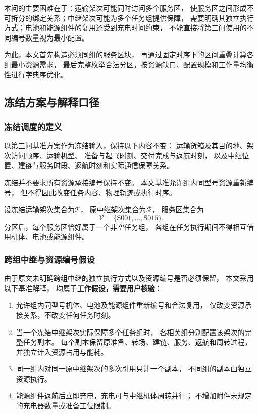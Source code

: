 \documentclass[bwprint]{gmcmthesis}
\begin{document}
本问的主要困难在于：运输架次可能同时访问多个服务区，
使服务区之间形成不可拆分的绑定关系；中继架次可能为多个任务组提供保障，
需要明确其独立执行方式；电池和能源组件的复用还受到充电时间约束，
不能直接将第三问使用的不同编号数量视为最小配置。

为此，本文首先构造必须同组的服务区块，
再通过固定时序下的区间重叠计算各组最小资源需求，
最后完整枚举合法分区，按资源缺口、配置规模和工作量均衡性进行字典序优化。

\subsection{冻结方案与解释口径}

\subsubsection{冻结调度的定义}

以第三问基准方案作为冻结输入，保持以下内容不变：
运输货箱及其目的地、架次访问顺序、运输机型、
准备与起飞时刻、交付完成与返航时刻，
以及中继位置、建链与服务时段、返航时刻和实际通信保障关系。

冻结并不要求所有资源承接编号保持不变。
本文基准允许组内同型号资源重新编号，
但不得因此改变任务内容、物理轨迹或执行时序。

设冻结运输架次集合为$\mathcal{T}$，
原中继架次集合为$\mathcal{R}$，
服务区集合为
\begin{equation}
\mathcal{V}=\{\mathrm{S001},\ldots,\mathrm{S015}\}.
\end{equation}
分区后，每个服务区恰好属于一个非空任务组，
各组在任务执行期间不得相互借用机体、电池或能源组件。

\subsubsection{跨组中继与资源编号假设}

由于原文未明确跨组中继的独立执行方式以及资源编号是否必须保留，
本文采用以下基准解释，
均属于\textbf{工作假设，需要用户核验}：

\begin{enumerate}
    \item 允许组内同型号机体、电池及能源组件重新编号和合法复用，
    仅改变资源承接关系，不改变任何任务时刻。

    \item 当一个冻结中继架次实际保障多个任务组时，
    各相关组分别配置该架次的完整任务副本。
    每个副本保留原准备、转场、建链、服务、返航和周转过程，
    并独立计入资源占用与能耗。

    \item 同一组内对同一原中继架次的多次引用只计一个副本，
    不同组的副本由独立资源执行。

    \item 能源组件返航后立即充电，充电可与中继机体周转并行；
    不增加附件未规定的充电器数量或准备工位限制。
\end{enumerate}
\end{document}
